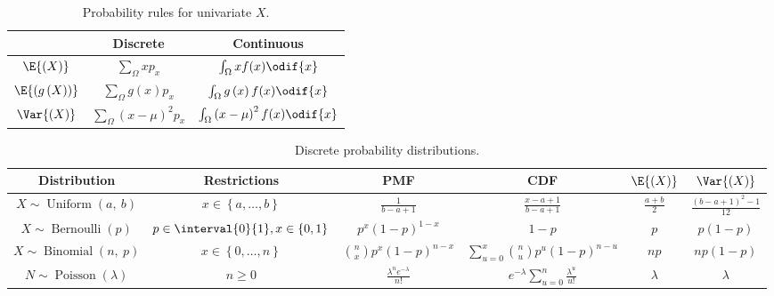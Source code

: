 \documentclass{article}
\begin{document}
\begin{table}[H]
    \centering
    \begin{tabular}{c c c }
        \toprule
                                                 & \textbf{Discrete}                              & \textbf{Continuous}                                    \\
        \midrule
        \(\E{\left( X \right)}\)                 & \(\sum_{\Omega} xp_x\)                         & \(\int_{\Omega} xf(x)\odif{x}\)                        \\
        \(\E{\left( g\left( X \right) \right)}\) & \(\sum_{\Omega} g\left( x \right)p_x\)         & \(\int_{\Omega} g\left( x \right)f(x)\odif{x}\)        \\
        \(\Var{\left( X \right)}\)               & \(\sum_{\Omega} \left( x - \mu \right)^2 p_x\) & \(\int_{\Omega} \left( x - \mu \right)^2f(x)\odif{x}\) \\
        \bottomrule
    \end{tabular}
    \caption{Probability rules for univariate \(X\).} %
\end{table}
\begin{table}[H]
    \centering
    \begin{tabular}{c c c c c c}
        \toprule
        \textbf{Distribution}                                     & \textbf{Restrictions}                                  & \textbf{PMF}                                      & \textbf{CDF}                                                     & \(\E{\left( X \right)}\) & \(\Var{\left( X \right)}\)                    \\
        \midrule
        \(X \sim \operatorname{Uniform}{\left( a,\: b \right)}\)  & \(x \in \left\{ a, \dots, b \right\}\)                 & \(\frac{1}{b - a + 1}\)                           & \(\frac{x - a + 1}{b - a + 1}\)                                  & \(\frac{a + b}{2}\)      & \(\frac{\left( b - a + 1 \right)^2 - 1}{12}\) \\
        \(X \sim \operatorname{Bernoulli}{\left( p \right)}\)     & \(p \in \interval{0}{1}, x \in \left\{ 0, 1 \right\}\) & \(p^x \left( 1 - p \right)^{1 - x}\)              & \(1 - p\)                                                        & \(p\)                    & \(p \left( 1 - p \right)\)                    \\
        \(X \sim \operatorname{Binomial}{\left( n,\: p \right)}\) & \(x \in \left\{ 0, \dots, n \right\}\)                 & \(\binom{n}{x} p^x \left( 1 - p \right)^{n - x}\) & \(\sum_{u = 0}^x \binom{n}{u} p^u \left( 1 - p \right)^{n - u}\) & \(np\)                   & \(np\left( 1 - p \right)\)                    \\
        \(N \sim \operatorname{Poisson}{\left( \lambda \right)}\) & \(n \geq 0\)                                           & \(\frac{\lambda^n e^{-\lambda}}{n!}\)             & \(e^{-\lambda} \sum_{u = 0}^n \frac{\lambda^u}{u!}\)             & \(\lambda\)              & \(\lambda\)                                   \\
        \bottomrule
    \end{tabular}
    \caption{Discrete probability distributions.} %
\end{table}
\end{document}
